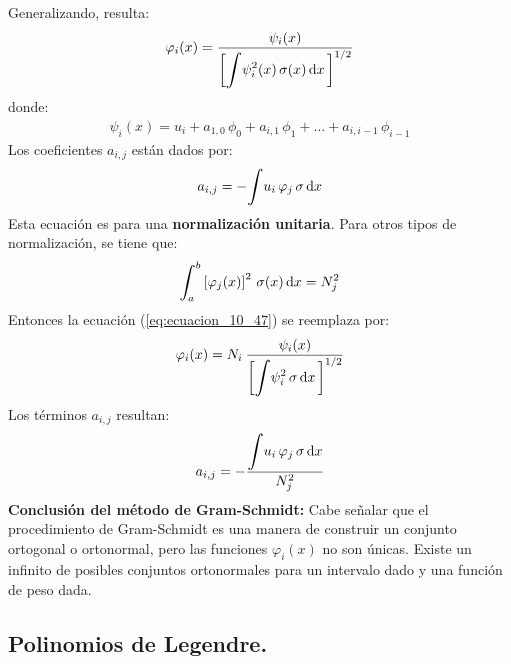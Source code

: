 \documentclass[12pt]{article}
\def\scaleint#1{\vcenter{\hbox{\scaleto[3ex]{\displaystyle\int}{#1}}}}
\def\bs{\mkern-12mu}
\numberwithin{equation}{section}
\begin{document}
Generalizando, resulta:
\begin{align}
\varphi_{i} (x) = \dfrac{\psi_{i} (x)}{ \bigg[ \displaystyle \scaleint{6ex} \psi_{i}^{2} (x) \, \sigma (x) \dd{x} \bigg]^{1/2}}
\label{eq:ecuacion_10_47}
\end{align}
donde:
\begin{align}
\psi_{i}(x) = u_{i} + a_{1, 0} \, \phi_{0} + a_{i, 1} \, \phi_{1} + \ldots + a_{i, i-1} \, \phi_{i-1}
\label{eq:ecuacion_10_48}
\end{align}
Los coeficientes $a_{i, j}$ están dados por:
\begin{align}
a_{i, j} = - \scaleint{6ex} u_{i} \, \varphi_{j} \, \sigma  \dd{x}
\label{eq:ecuacion_10_49}
\end{align}
Esta ecuación es para una \textbf{normalización unitaria}. Para otros tipos de normalización, se tiene que:
\begin{align*}
\scaleint{6ex}_{\bs a}^{b} \left[ \varphi_{j} (x) \right]^{2} \, \sigma (x) \dd{x} =  N_{j}^{2}
\end{align*}
Entonces la ecuación (\ref{eq:ecuacion_10_47}) se reemplaza por:
\begin{align}
\varphi_{i} (x) =  N_{i} \: \dfrac{\psi_{i} (x)}{ \bigg[ \displaystyle \scaleint{6ex} \psi_{i}^{2} \, \sigma \dd{x} \bigg]^{1/2}}
\label{eq:ecuacion_10_47a}
\end{align}
Los términos $a_{i,j}$ resultan:
\begin{align}
a_{i, j} = - \dfrac{ \displaystyle \scaleint{6ex} u_{i} \, \varphi_{j} \, \sigma \dd{x}}{N_{j}^{2}}
\label{eq:ecuacion_10_49a}
\end{align}
\textbf{Conclusión del método de Gram-Schmidt: } Cabe señalar que el procedimiento de Gram-Schmidt es una  manera de construir un conjunto ortogonal o ortonormal, pero las funciones $\varphi_{i}(x)$ no son únicas. Existe un infinito de posibles conjuntos ortonormales para un intervalo dado y una función de peso dada.

\subsection{Polinomios de Legendre.}
\end{document}
